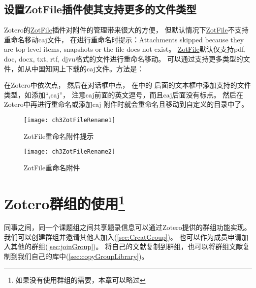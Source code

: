 \documentclass[cn,11pt,chinese]{elegantbook}
\begin{document}
\begin{enumerate}
	\section{设置ZotFile插件使其支持更多的文件类型}\label{sec:zotFile_more_filetype}
	    \quad \quad Zotero的\href{http://zotfile.com/}{ZotFile}插件对附件的管理带来很大的方便，
		但默认情况下\href{http://zotfile.com/}{ZotFile}不支持重命名移动caj文件，
		在进行重命名时提示：Attachments skipped because they are top-level items, 
		snapshots or the file does not exist。
		\href{http://zotfile.com/}{ZotFile}默认仅支持pdf, doc, docx, txt, rtf, djvu格式的文件进行重命名移动。
		可以通过支持更多类型的文件，如从中国知网上下载的caj文件。方法是：

		\quad \quad 在Zotero中依次点，
		然后在对话框中点，
		在中的
		后面的文本框中添加支持的文件类型，如添加“,caj”，
		注意caj前面的英文逗号，而且caj后面没有标点。
		然后在Zotero中再进行重命名或添加caj
		附件时就会重命名且移动到自定义的目录中了。

	
			\begin{figure}[htbp]
				\centering
				\texttt{[image: ch3ZotFileRename1]}
				\caption{ZotFile重命名附件提示}
				\label{fig:ch3ZotFileRename1}
			\end{figure}
			\begin{figure}[htbp]
				\centering
				\texttt{[image: ch3ZotFileRename2]}
				\caption{ZotFile重命名附件}
				\label{fig:ch3ZotFileRename2}
			\end{figure}
		\end{enumerate}


  \chapter[Zotero群组的使用]{Zotero群组的使用\footnote{如果没有使用群组的需要，本章可以略过}}\label{ch:group}
	同事之间，同一个课题组之间共享题录信息可以通过Zotero提供的群组功能实现。
	我们可以创建群组并邀请其他人加入(\cref{sec:CreatGroup})。
	也可以作为成员申请加入其他的群组(\cref{sec:joinGroup})。
	将自己的文献复制到群组，也可以将群组文献复制到我们自己的库中(\cref{sec:copyGroupLibrary})。


   
\end{document}
